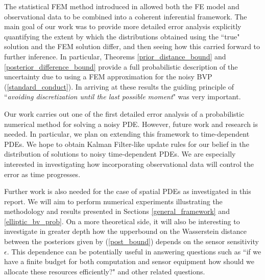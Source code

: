 The statistical FEM method introduced in \textcolor{blue}{\citep{girolami2019statistical}} allowed both the FE model and observational data to be combined into a coherent inferential framework. The main goal of our work was to provide more detailed error analysis explicitly quantifying the extent by which the distributions obtained using the ``true" solution and the FEM solution differ, and then seeing how this carried forward to further inference. In particular, Theorems \textcolor{blue}{\ref{prior_distance_bound}} and \textcolor{blue}{\ref{posterior_difference_bound}} provide a full probabilistic description of the uncertainty due to using a FEM approximation for the noisy BVP (\ref{standard_conduct}). In arriving at these results the guiding principle of ``\textit{avoiding discretization until the last possible moment}" \textcolor{blue}{\citep{stuart2010inverse}} was very important.

Our work carries out one of the first detailed error analysis of a probabilistic numerical method for solving a noisy PDE. However, future work and research is needed. In particular, we plan on extending this framework to time-dependent PDEs. We hope to obtain Kalman Filter-like update rules for our belief in the distribution of solutions to noisy time-dependent PDEs. We are especially interested in investigating how incorporating observational data will control the error as time progresses.

Further work is also needed for the case of spatial PDEs as investigated in this report. We will aim to perform numerical experiments illustrating the methodology and results presented in Sections \textcolor{blue}{\ref{general_framework}} and \textcolor{blue}{\ref{elliptic_bv_prob}}. On a more theoretical side, it will also be interesting to investigate in greater depth how the upperbound on the Wasserstein distance between the posteriors given by (\ref{post_bound}) depends on the sensor sensitivity $\epsilon$. This dependence can be potentially useful in answering questions such as ``if we have a finite budget for both computation and sensor equipment how should we allocate these resources efficiently?" and other related questions.
